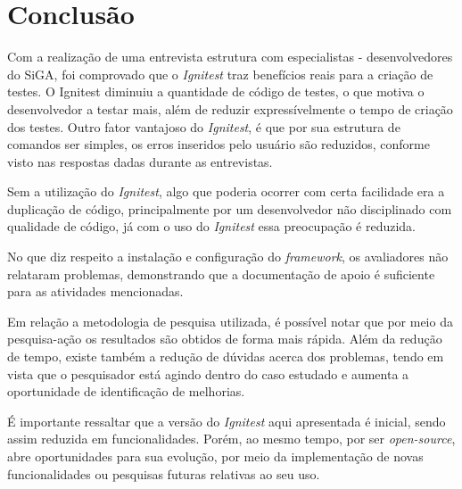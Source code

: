 \chapter{Conclusão}

  Com a realização de uma entrevista estrutura com especialistas - desenvolvedores do SiGA, foi comprovado que o \textit{Ignitest} traz benefícios reais para a criação de testes.
  O Ignitest diminuiu a quantidade de código de testes, o que motiva o desenvolvedor a testar mais, além de reduzir expressívelmente o tempo de criação dos testes.
  Outro fator vantajoso do \textit{Ignitest}, é que por sua estrutura de comandos ser simples, os erros inseridos pelo usuário são reduzidos, conforme visto nas respostas dadas durante as entrevistas.
  
  Sem a utilização do \textit{Ignitest}, algo que poderia ocorrer com certa facilidade era a duplicação de código, principalmente por um desenvolvedor não disciplinado com qualidade de código, já com o uso do \textit{Ignitest} essa preocupação é reduzida.
  
  No que diz respeito a instalação e configuração do \textit{framework}, os avaliadores não relataram problemas, demonstrando que a documentação de apoio é suficiente para as atividades mencionadas.
  
  Em relação a metodologia de pesquisa utilizada, é possível notar que por meio da pesquisa-ação os resultados são obtidos de forma mais rápida. Além da redução de tempo, existe também a redução de dúvidas acerca dos problemas, tendo em vista que o pesquisador está agindo dentro do caso estudado e aumenta a oportunidade de identificação de melhorias.
  
  É importante ressaltar que a versão do \textit{Ignitest} aqui apresentada é inicial, sendo assim reduzida em funcionalidades. Porém, ao mesmo tempo, por ser \textit{open-source}, abre oportunidades para sua evolução, por meio da implementação de novas funcionalidades ou pesquisas futuras relativas ao seu uso.